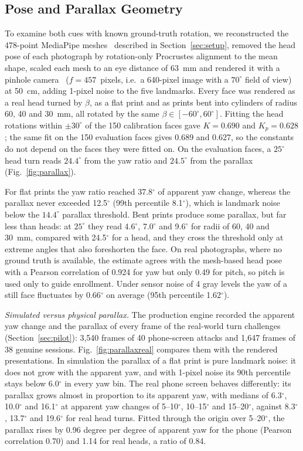 \documentclass{ieeeaccess}
\begin{document}
\subsection{Pose and Parallax Geometry}\label{sec:pose}
To examine both cues with known ground-truth rotation, we reconstructed the 478-point MediaPipe meshes~\cite{kartynnik2019facemesh} described in Section~\ref{sec:setup}, removed the head pose of each photograph by rotation-only Procrustes alignment to the mean shape, scaled each mesh to an eye distance of 63~mm and rendered it with a pinhole camera~\cite{hartley2004mvg} ($f=457$~pixels, i.e.\ a 640-pixel image with a $70^\circ$ field of view) at 50~cm, adding 1-pixel noise to the five landmarks. Every face was rendered as a real head turned by $\beta$, as a flat print and as prints bent into cylinders of radius 60, 40 and 30~mm, all rotated by the same $\beta\in[-60^\circ,60^\circ]$. Fitting the head rotations within $\pm30^\circ$ of the 150 calibration faces gave $K=0.690$ and $K_p=0.628$; the same fit on the 150 evaluation faces gives 0.689 and 0.627, so the constants do not depend on the faces they were fitted on. On the evaluation faces, a $25^\circ$ head turn reads $24.4^\circ$ from the yaw ratio and $24.5^\circ$ from the parallax (Fig.~\ref{fig:parallax}).

For flat prints the yaw ratio reached 37.8$^\circ$ of apparent yaw change, whereas the parallax never exceeded 12.5$^\circ$ (99th percentile 8.1$^\circ$), which is landmark noise below the $14.4^\circ$ parallax threshold. Bent prints produce some parallax, but far less than heads: at $25^\circ$ they read 4.6$^\circ$, 7.0$^\circ$ and 9.6$^\circ$ for radii of 60, 40 and 30~mm, compared with 24.5$^\circ$ for a head, and they cross the threshold only at extreme angles that also foreshorten the face. On real photographs, where no ground truth is available, the estimate agrees with the mesh-based head pose with a Pearson correlation of 0.924 for yaw but only 0.49 for pitch, so pitch is used only to guide enrollment. Under sensor noise of 4 gray levels the yaw of a still face fluctuates by 0.66$^\circ$ on average (95th percentile 1.62$^\circ$).

\emph{Simulated versus physical parallax.} The production engine recorded the apparent yaw change and the parallax of every frame of the real-world turn challenges (Section~\ref{sec:pilot}): 3,540 frames of 40 phone-screen attacks and 1,647 frames of 38 genuine sessions. Fig.~\ref{fig:parallaxreal} compares them with the rendered presentations. In simulation the parallax of a flat print is pure landmark noise: it does not grow with the apparent yaw, and with 1-pixel noise its 90th percentile stays below 6.0$^\circ$ in every yaw bin. The real phone screen behaves differently: its parallax grows almost in proportion to its apparent yaw, with medians of 6.3$^\circ$, 10.0$^\circ$ and 16.1$^\circ$ at apparent yaw changes of 5--10$^\circ$, 10--15$^\circ$ and 15--20$^\circ$, against 8.3$^\circ$, 13.7$^\circ$ and 19.6$^\circ$ for real head turns. Fitted through the origin over 5--20$^\circ$, the parallax rises by 0.96 degree per degree of apparent yaw for the phone (Pearson correlation 0.70) and 1.14 for real heads, a ratio of 0.84.
\end{document}
